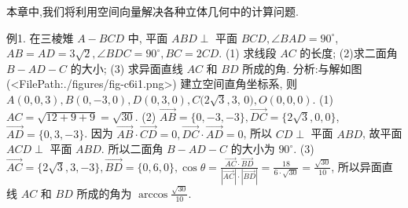 
本章中,我们将利用空间向量解决各种立体几何中的计算问题.



例1. 在三棱雉 $A-B C D$ 中, 平面 $A B D \perp$ 平面 $B C D, \angle B A D=90^{\circ}$, $A B=A D=3 \sqrt{2}, \angle B D C=90^{\circ}, B C=2 C D$.
(1) 求线段 $A C$ 的长度;
(2)求二面角 $B-A D-C$ 的大小;
(3) 求异面直线 $A C$ 和 $B D$ 所成的角.
分析:与解如图(<FilePath:./figures/fig-c6i1.png>) 建立空间直角坐标系, 则 $A(0,0,3), B(0,-3,0), D(0,3,0), C(2 \sqrt{3}, 3$, $0), O(0,0,0)$.
(1) $A C=\sqrt{12+9+9}=\sqrt{30}$.
(2) $\overrightarrow{A B}=\{0,-3,-3\}, \overrightarrow{D C}=\{2 \sqrt{3}, 0,0\}$, $\overrightarrow{A D}=\{0,3,-3\}$.
因为 $\overrightarrow{A B} \cdot \overrightarrow{C D}=0, \overrightarrow{D C} \cdot \overrightarrow{A D}=0$, 所以 $C D \perp$ 平面 $A B D$, 故平面 $A C D \perp$ 平面 $A B D$.
所以二面角 $B-A D-C$ 的大小为 $90^{\circ}$.
(3) $\overrightarrow{A C}=\{2 \sqrt{3}, 3,-3\}, \overrightarrow{B D}=\{0,6,0\}, \cos \theta=\frac{\overrightarrow{A C} \cdot \overrightarrow{B D}}{|\overrightarrow{A C}| \cdot|\overrightarrow{B D}|}= \frac{18}{6 \cdot \sqrt{30}}=\frac{\sqrt{30}}{10}$, 所以异面直线 $A C$ 和 $B D$ 所成的角为 $\arccos \frac{\sqrt{30}}{10}$.



